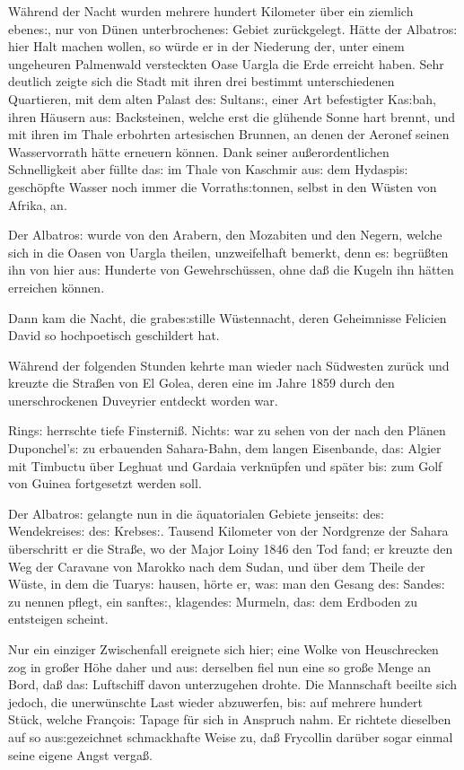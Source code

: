 \documentclass[oneside,12pt]{book}
\newcommand{\s}{s:}
\begin{document}
W\"ahrend der Nacht wurden mehrere hundert Kilometer \"uber ein
ziemlich ebene{\s}, nur von D\"unen unterbrochene{\s} Gebiet
zur\"uckgelegt. H\"atte der {\glqq}Albatro{\s}{\grqq} hier Halt
machen wollen, so w\"urde er in der Niederung der, unter einem
ungeheuren Palmenwald versteckten Oase Uargla die Erde erreicht
haben. Sehr deutlich zeigte sich die Stadt mit ihren drei bestimmt
unterschiedenen Quartieren, mit dem alten Palast de{\s} Sultan{\s},
einer Art befestigter Ka{\s}bah, ihren H\"ausern au{\s} Backsteinen,
welche erst die gl\"uhende Sonne hart brennt, und mit ihren im Thale
erbohrten artesischen Brunnen, an denen der Aeronef seinen
Wasservorrath h\"atte erneuern k\"onnen. Dank seiner
au{\ss}erordentlichen Schnelligkeit aber f\"ullte da{\s} im Thale von
Kaschmir au{\s} dem Hydaspi{\s} gesch\"opfte Wasser noch immer die
Vorrath{\s}tonnen, selbst in den W\"usten von Afrika, an.

Der {\glqq}Albatro{\s}{\grqq} wurde von den Arabern, den Mozabiten
und den Negern, welche sich in die Oasen von Uargla theilen,
unzweifelhaft bemerkt, denn e{\s} begr\"u{\ss}ten ihn von hier au{\s}
Hunderte von Gewehrsch\"ussen, ohne da{\ss} die Kugeln ihn h\"atten
erreichen k\"onnen.

Dann kam die Nacht, die grabe{\s}stille W\"ustennacht, deren
Geheimnisse Felicien David so hochpoetisch geschildert hat.

W\"ahrend der folgenden Stunden kehrte man wieder nach S\"udwesten
zur\"uck und kreuzte die Stra{\ss}en von El Golea, deren eine im
Jahre 1859 durch den unerschrockenen Duveyrier entdeckt worden war.

Ring{\s} herrschte tiefe Finsterni{\ss}. Nicht{\s} war zu sehen von
der nach den Pl\"anen Duponchel'{\s} zu erbauenden Sahara-Bahn, dem
langen Eisenbande, da{\s} Algier mit Timbuctu \"uber Leghuat und
Gardaia verkn\"upfen und sp\"ater bi{\s} zum Golf von Guinea
fortgesetzt werden soll.

Der {\glqq}Albatro{\s}{\grqq} gelangte nun in die \"aquatorialen
Gebiete jenseit{\s} de{\s} Wendekreise{\s} de{\s} Krebse{\s}. Tausend
Kilometer von der Nordgrenze der Sahara \"uberschritt er die
Stra{\ss}e, wo der Major Loiny 1846 den Tod fand; er kreuzte den Weg
der Caravane von Marokko nach dem Sudan, und \"uber dem Theile der
W\"uste, in dem die Tuary{\s} hausen, h\"orte er, wa{\s} man den
{\glqq}Gesang de{\s} Sande{\s}{\grqq} zu nennen pflegt, ein
sanfte{\s}, klagende{\s} Murmeln, da{\s} dem Erdboden zu entsteigen
scheint.

Nur ein einziger Zwischenfall ereignete sich hier; eine Wolke von
Heuschrecken zog in gro{\ss}er H\"ohe daher und au{\s} derselben fiel
nun eine so gro{\ss}e Menge an Bord, da{\ss} da{\s} Luftschiff davon
unterzugehen drohte. Die Mannschaft beeilte sich jedoch, die
unerw\"unschte Last wieder abzuwerfen, bi{\s} auf mehrere hundert
St\"uck, welche Fran\c{c}oi{\s} Tapage f\"ur sich in Anspruch nahm.
Er richtete dieselben auf so au{\s}gezeichnet schmackhafte Weise zu,
da{\ss} Frycollin dar\"uber sogar einmal seine eigene Angst
verga{\ss}.
\end{document}
